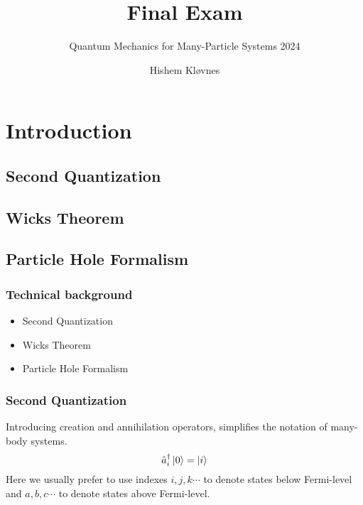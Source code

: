 \documentclass[UKenglish,aspectratio=169,12pt]{beamer}
\author{Hishem Kløvnes}
\title{Final Exam}
\subtitle{Quantum Mechanics for Many-Particle Systems 2024}
\begin{document}
\uiofrontpage[dept={Department of Physics},
  info={Final Exam}]


\section{Introduction}
\subsection{Second Quantization}
\subsection{Wicks Theorem}
\subsection{Particle Hole Formalism}


\begin{frame}
    \frametitle{Technical background}
    \begin{itemize}
        \item Second Quantization
        \item Wicks Theorem
        \item Particle Hole Formalism      
    \end{itemize}
\end{frame}

\begin{frame}
    \frametitle{Second Quantization}
    Introducing creation and annihilation operators, simplifies the notation of many-body systems. 
    \[
        \hat{a}^\dagger_i \ket{0} = \ket{i}
    \]
    Here we usually prefer to use indexes $i,j,k\cdots $ to denote states below Fermi-level and $a,b,c\cdots$ to denote states above Fermi-level. 

\end{frame}
\end{document}
